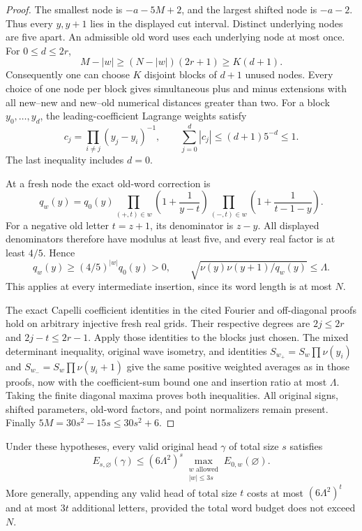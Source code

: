 \begin{proof}
The smallest node is $-a-5M+2$, and the largest shifted node is
$-a-2$.  Thus every $y,y+1$ lies in the displayed cut interval.
Distinct underlying nodes are five apart.  An admissible old word
uses each underlying node at most once.  For $0\le d\le2r$,
\[
 M-|w|\ge(N-|w|)(2r+1)\ge K(d+1).
\]
Consequently one can choose $K$ disjoint blocks of $d+1$ unused
nodes.  Every choice of one node per block gives simultaneous plus
and minus extensions with all new--new and new--old numerical
distances greater than two.  For a block $y_0,\ldots,y_d$, the
leading-coefficient Lagrange weights satisfy
\[
 c_j=\prod_{i\ne j}(y_j-y_i)^{-1},\qquad
 \sum_{j=0}^d|c_j|\le(d+1)5^{-d}\le1.
\]
The last inequality includes $d=0$.

At a fresh node the exact old-word correction is
\[
 q_w(y)=q_0(y)
  \prod_{(+,t)\in w}\left(1+\frac1{y-t}\right)
  \prod_{(-,t)\in w}\left(1+\frac1{t-1-y}\right).
\]
For a negative old letter $t=z+1$, its denominator is $z-y$.
All displayed denominators therefore have modulus at least five,
and every real factor is at least $4/5$.  Hence
\[
 q_w(y)\ge(4/5)^{|w|}q_0(y)>0,\qquad
 \sqrt{\nu(y)\nu(y+1)/q_w(y)}\le\Lambda.
\]
This applies at every intermediate insertion, since its word
length is at most $N$.

The exact Capelli coefficient identities in the cited Fourier and
off-diagonal proofs hold on arbitrary injective fresh real grids.
Their respective degrees are $2j\le2r$ and
$2j-t\le2r-1$.  Apply those identities to the blocks just chosen.
The mixed determinant inequality, original wave isometry, and
identities $S_{w_+}=S_w\prod\nu(y_i)$ and
$S_{w_-}=S_w\prod\nu(y_i+1)$ give the same positive weighted
averages as in those proofs, now with the coefficient-sum bound
one and insertion ratio at most $\Lambda$.  Taking the finite
diagonal maxima proves both inequalities.  All original signs,
shifted parameters, old-word factors, and point normalizers remain
present.  Finally $5M=30s^2-15s\le30s^2+6$.
\end{proof}

\begin{theorem}\label{adaptive-all-head-pointwise}
Under these hypotheses, every valid original head $\gamma$ of
total size $s$ satisfies
\begin{equation}\label{adaptive-all-head-bound}
 E_{s,\varnothing}(\gamma)
 \le(6\Lambda^2)^s
       \max_{\substack{w\text{ allowed}\\|w|\le3s}}
                      E_{0,w}(\varnothing).
\end{equation}
More generally, appending any valid head of total size $t$ costs
at most $(6\Lambda^2)^t$ and at most $3t$ additional letters,
provided the total word budget does not exceed $N$.
\end{theorem}

